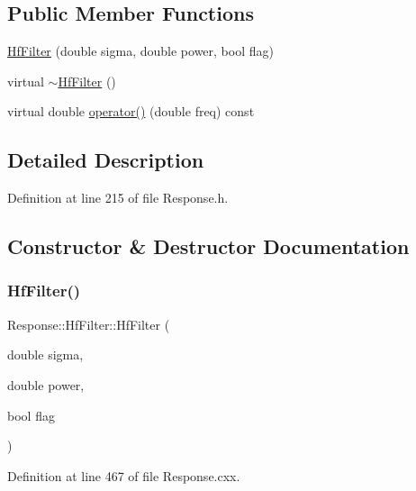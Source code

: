 \subsection*{Public Member Functions}
\begin{DoxyCompactItemize}
\item 
\hyperlink{class_wire_cell_1_1_response_1_1_hf_filter_a306f71324f75c47a5ce69db8ef9ec224}{Hf\+Filter} (double sigma, double power, bool flag)
\item 
virtual \hyperlink{class_wire_cell_1_1_response_1_1_hf_filter_adffa85aebeca3e84450e53a31170a62e}{$\sim$\+Hf\+Filter} ()
\item 
virtual double \hyperlink{class_wire_cell_1_1_response_1_1_hf_filter_afef6eabeb4c0632352c574f6f263405b}{operator()} (double freq) const
\end{DoxyCompactItemize}


\subsection{Detailed Description}


Definition at line 215 of file Response.\+h.



\subsection{Constructor \& Destructor Documentation}
\mbox{\label{class_wire_cell_1_1_response_1_1_hf_filter_a306f71324f75c47a5ce69db8ef9ec224}} 
\subsubsection{\texorpdfstring{Hf\+Filter()}{HfFilter()}}
{\footnotesize\ttfamily Response\+::\+Hf\+Filter\+::\+Hf\+Filter (\begin{DoxyParamCaption}\item[{double}]{sigma,  }\item[{double}]{power,  }\item[{bool}]{flag }\end{DoxyParamCaption})}



Definition at line 467 of file Response.\+cxx.

